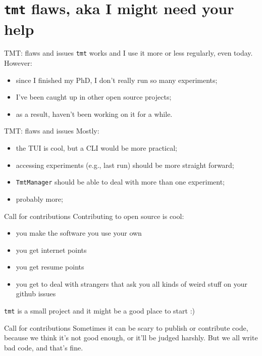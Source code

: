 \documentclass[aspectratio=169,xcolor={dvipsnames}]{beamer}
\begin{document}
  \section{\texttt{tmt} flaws, aka I might need your help} 
  \begin{frame}{TMT: flaws and issues}
    \texttt{tmt} works and I use it more or less regularly, even today.
    However:
    \begin{itemize}
      \item since I finished my PhD, I don't really run so many experiments;
      \item I've been caught up in other open source projects;
      \item as a result, haven't been working on it for a while.
    \end{itemize}
  \end{frame}
  \begin{frame}{TMT: flaws and issues}
    Mostly:
    \begin{itemize}
      \item the TUI is cool, but a CLI would be more practical;
      \item accessing experiments (e.g., last run) should be more straight forward;
      \item \texttt{TmtManager} should be able to deal with more than one experiment;
      \item probably more;
    \end{itemize} 
  \end{frame}
  \begin{frame}{Call for contributions}
    Contributing to open source is cool:
    \begin{itemize}
      \item you make the software you use your own 
      \item you get internet points 
      \item you get resume points 
      \item \tiny{you get to deal with strangers that ask you all kinds of weird stuff on your github issues }
    \end{itemize}
    \texttt{tmt} is a small project and it might be a good place to start :)
  \end{frame}
  \begin{frame}{Call for contributions}
    Sometimes it can be scary to publish or contribute code, because we think it's not good enough, or it'll be 
    judged harshly. But we all write bad code, and that's fine.
  \end{frame}
\end{document}
